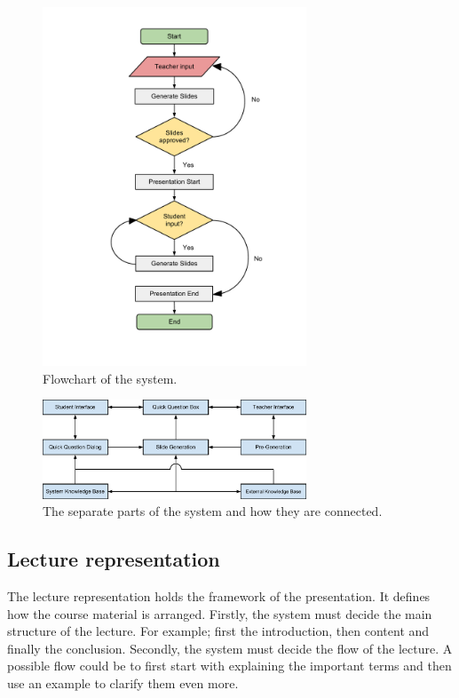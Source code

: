 \documentclass[11pt]{article}
\begin{document}
\begin{figure}[!h]
\centering
\includegraphics[width=0.7\textwidth]{KBMSFlowchartnew.pdf}
\caption{Flowchart of the system.}
\label{flowchart}
\end{figure}

\begin{figure}[!h]
\centering
\includegraphics[width=0.7\textwidth]{systemOverview.pdf}
\caption{The separate parts of the system and how they are connected.}
\label{systemOverview}
\end{figure}

\subsection{Lecture representation}
The lecture representation holds the framework of the presentation. It defines how the course material is arranged. Firstly, the system must decide the main structure of the lecture. For example; first the introduction, then content and finally the conclusion. Secondly, the system must decide the flow of the lecture. A possible flow could be to first start with explaining the important terms and then use an example to clarify them even more.
\end{document}
